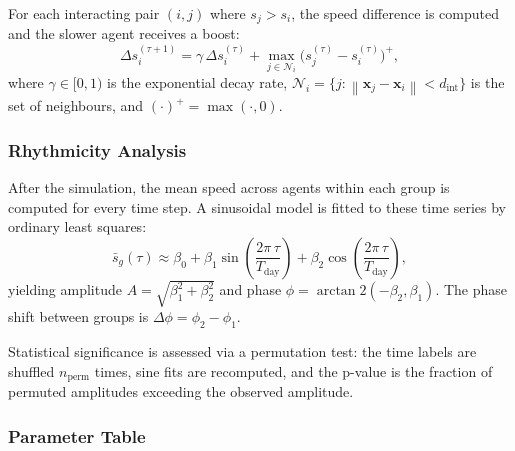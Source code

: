 \documentclass{article}
\newcommand{\vect}[1]{\mathbf{#1}}
\newcommand{\norm}[1]{\left\lVert #1 \right\rVert}
\begin{document}
{For each interacting pair $(i, j)$ where $s_j > s_i$, the speed difference is
computed and the slower agent receives a boost:
%
\begin{equation}
  \Delta s_i^{(\tau+1)} = \gamma \, \Delta s_i^{(\tau)}
    + \max_{j \in \mathcal{N}_i}\!\bigl(s_j^{(\tau)} - s_i^{(\tau)}\bigr)^{+},
\end{equation}
%
where $\gamma \in [0, 1)$ is the exponential decay rate,
$\mathcal{N}_i = \{j : \norm{\vect{x}_j - \vect{x}_i} < d_{\mathrm{int}}\}$ is
the set of neighbours, and $(\cdot)^{+} = \max(\cdot, 0)$.

\subsubsection*{Rhythmicity Analysis}

After the simulation, the mean speed across agents within each group is
computed for every time step.  A sinusoidal model is fitted to these time
series by ordinary least squares:
%
\begin{equation}
  \bar{s}_g(\tau) \approx \beta_0 + \beta_1 \sin\!\left(\frac{2\pi\,\tau}{T_{\mathrm{day}}}\right)
                                   + \beta_2 \cos\!\left(\frac{2\pi\,\tau}{T_{\mathrm{day}}}\right),
\end{equation}
%
yielding amplitude $A = \sqrt{\beta_1^2 + \beta_2^2}$ and phase
$\phi = \arctan2(-\beta_2, \beta_1)$.  The phase shift between groups is
$\Delta\phi = \phi_2 - \phi_1$.

Statistical significance is assessed via a permutation test: the time labels
are shuffled $n_{\mathrm{perm}}$ times, sine fits are recomputed, and the
p-value is the fraction of permuted amplitudes exceeding the observed
amplitude.

\subsubsection*{Parameter Table}

}
\end{document}
